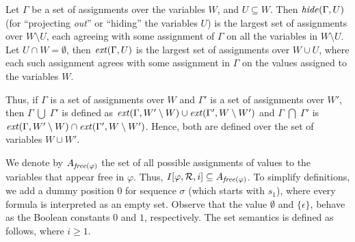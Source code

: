 \documentclass{llncs}
\begin{document}
Let $\Gamma$ be
a set of assignments over the variables $W$, and
$U \subseteq W$.
Then $\mathit{hide} ( \Gamma , U )$ (for ``projecting {\em out}'' or  ``hiding''
the variables $U$)
is the largest set of assignments over 
$W \setminus U$, 
each agreeing with some
assignment of $\Gamma$ on all the variables in $W \setminus U$.
Let $U \cap W = \emptyset$, then
$\mathit{ext} ( \Gamma , U )$ is the largest set of assignments
over $W \cup U$, where each such assignment agrees 
with some assignment in $\Gamma$ on the
values assigned to the variables $W$. 
\iffalse
This means that we extend $\Gamma$ by
adding arbitrary values to the variables in $U$ from their domains.
Then $\proj ( \ext ( \Gamma , U ) , U ) = \Gamma$ holds.
We define the union and intersection operators on sets of
assignments, even if they are defined over non identical
sets of variables. 
In this case, the assignments are extended
over the union of the variables. 
\fi
Thus, if $\Gamma$ is a
set of assignments over $W$ and $\Gamma'$ is
a set of assignments over $W'$, then
$\Gamma \; \bigcup \;  \Gamma'$ is defined as $\mathit{ext} (\Gamma , W' \setminus W ) \cup
\mathit{ext} ( \Gamma' , W \setminus W' )$ and
$\Gamma \; \bigcap \; \Gamma'$ is $\mathit{ext} (\Gamma , W' \setminus W ) \cap
\mathit{ext} ( \Gamma' , W \setminus W' )$.  Hence, both are defined
over the set of variables $W \cup W'$.

We denote by $A_{\mathit{free} ( \varphi )}$ the set of all possible assignments
of values to the variables that appear free
in $\varphi$. Thus,
$I [ \varphi, {\cal R} , i] \subseteq A_{\mathit{free} ( \varphi )}$.
To simplify definitions, we add
a dummy position $0$ for sequence $\sigma$ (which starts with $s_1$), 
where every formula is interpreted as an empty set.
Observe that the value $\emptyset$ and $\{ \epsilon \}$, behave
as the Boolean constants $0$ and $1$, respectively.
The set semantics is defined as follows, where $i \ge 1$.


\end{document}
